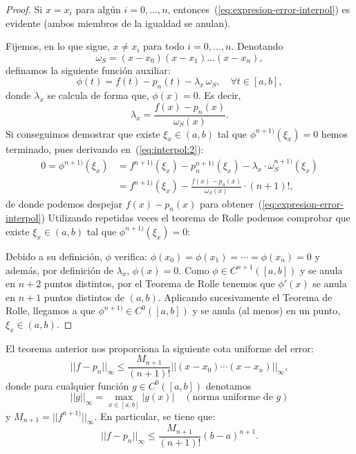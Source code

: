 \begin{proof}
  Si $x=x_i$ para algún $i=0,...,n$,
  entonces~(\ref{eq:expresion-error-interpol}) es evidente (ambos
  miembros de la igualdad se anulan).

  Fijemos, en lo que sigue, $x\neq x_i$ para todo $i=0,...,n$. Denotando
  \begin{equation}
  \omega_S=(x-x_0)(x-x_1)\dots (x-x_n),
 \label{eq:w_S:3} 
\end{equation}
  definamos la siguiente función auxiliar:
  \begin{equation}
    \phi(t)=f(t)-p_n(t)-\lambda_x\, \omega_S, \quad \forall t\in[a,b],
  \label{eq:interpol:2}
\end{equation}
  donde $\lambda_x$ se calcula de forma que, $\phi(x)=0$. Es
  decir,
  $$
  \lambda_x = \frac{f(x)-p_n(x)}{\omega_S(x)}.
  $$
  Si conseguimos demostrar que existe $\xi_x\in (a,b)$ tal que
  $\phi^{n+1)}(\xi_x)=0$ hemos terminado, pues derivando
  en~(\ref{eq:interpol:2}):
  \begin{align*}
    0=\phi^{n+1)}(\xi_x)&=f^{n+1)}(\xi_x)-p_n^{n+1)}(\xi_x)-\lambda_x\cdot\omega_S^{n+1)}(\xi_x)
    \\
    &=f^{n+1)}(\xi_x)- \frac{f(x)-p_n(x)}{\omega_S(x)}\cdot (n+1)!,
  \end{align*}
  de donde podemos despejar $f(x)-p_n(x)$ para
  obtener~(\ref{eq:expresion-error-interpol}) 
  Utilizando repetidas veces el teorema de Rolle podemos comprobar que
  existe $\xi_x\in (a,b)$ tal que $\phi^{n+1)}(\xi_x)=0$:

  Debido a su definición, $\phi$ verifica:
  $\phi(x_0)=\phi(x_1)=\cdots=\phi(x_n)=0$ y además, por definición de
  $\lambda_x$, $\phi(x)=0$. Como $\phi\in C^{n+1}([a,b])$ y se anula
  en $n+2$ puntos distintos, por el Teorema de Rolle tenemos que
  $\phi'(x)$ se anula en $n+1$ puntos distintos de $(a,b)$. Aplicando
  sucesivamente el Teorema de Rolle, llegamos a que $\phi^{n+1)}\in
  C^0([a,b])$ y se anula (al menos) en un punto, $\xi_x\in (a,b)$.
\end{proof}

\begin{remark}
  \label{rk:2}
  El teorema anterior nos proporciona la siguiente cota uniforme del
  error:
  \begin{equation}
    ||f-p_n||_{\infty} \le \frac{M_{n+1}}{(n+1)!}||(x-x_0)\cdots(x-x_n)||_\infty,
    \label{eq:cota-error-interpol-1}
  \end{equation}
  donde para cualquier función $g\in C^0([a,b])$ denotamos
  \begin{equation*}
    ||g||_\infty = \max_{x\in[a,b]} |g(x)|  \quad (\text{norma
      uniforme de $g$})
  \end{equation*}
  y $M_{n+1}=||f^{n+1)}||_\infty$.  En particular, se tiene que:
  \begin{equation*}
    ||f-p_n||_{\infty} \le \frac{M_{n+1}}{(n+1)!}(b-a)^{n+1}.
    \label{eq:cota-error-interpol-2}
  \end{equation*}
\end{remark}

